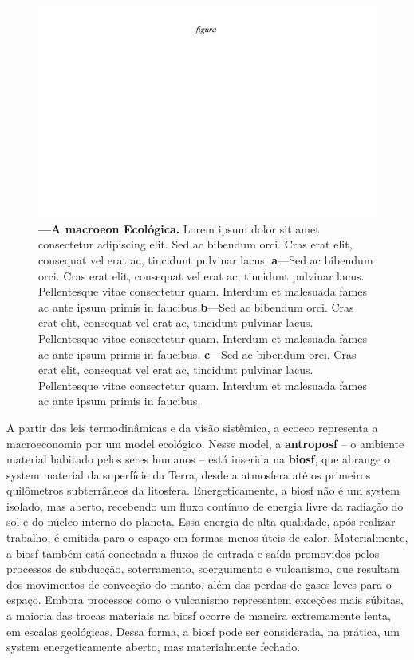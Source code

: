 \documentclass[./main.tex]{subfiles}
\begin{document}
\begin{figure}[t!] 
\centering				
\includegraphics[width=0.98\linewidth]{figs/fig_m.jpg}		
\caption[A \gls{macroeon} Ecológica]
{\textbf{---\;A \gls{macroeon} Ecológica.}
    Lorem ipsum dolor sit amet consectetur adipiscing elit. Sed ac bibendum orci. Cras erat elit, consequat vel erat ac, tincidunt pulvinar lacus. \;\textbf{a}\;---\;Sed ac bibendum orci. Cras erat elit, consequat vel erat ac, tincidunt pulvinar lacus. Pellentesque vitae consectetur quam. Interdum et malesuada fames ac ante ipsum primis in faucibus.\;\textbf{b}\;---\;Sed ac bibendum orci. Cras erat elit, consequat vel erat ac, tincidunt pulvinar lacus. Pellentesque vitae consectetur quam. Interdum et malesuada fames ac ante ipsum primis in faucibus. \;\textbf{c}\;---\;Sed ac bibendum orci. Cras erat elit, consequat vel erat ac, tincidunt pulvinar lacus. Pellentesque vitae consectetur quam. Interdum et malesuada fames ac ante ipsum primis in faucibus.
}
\label{fig:eco:ecomodel} 		
\end{figure}

\par A partir das leis termodinâmicas e da visão sistêmica, a \gls{ecoeco} representa a macroeconomia por um \gls{model} ecológico. Nesse \gls{model}, a \textbf{\gls{antroposf}} – o ambiente material habitado pelos seres humanos – está inserida na \textbf{\gls{biosf}}, que abrange o \gls{system} material da superfície da Terra, desde a atmosfera até os primeiros quilômetros subterrâneos da litosfera. Energeticamente, a \gls{biosf} não é um \gls{system} isolado, mas aberto, recebendo um fluxo contínuo de energia livre da radiação do sol e do núcleo interno do planeta. Essa energia de alta qualidade, após realizar trabalho, é emitida para o espaço em formas menos úteis de calor. Materialmente, a \gls{biosf} também está conectada a fluxos de entrada e saída promovidos pelos processos de subducção, soterramento, soerguimento e vulcanismo, que resultam dos movimentos de convecção do manto, além das perdas de gases leves para o espaço. Embora processos como o vulcanismo representem exceções mais súbitas, a maioria das trocas materiais na \gls{biosf} ocorre de maneira extremamente lenta, em escalas geológicas. Dessa forma, a \gls{biosf} pode ser considerada, na prática, um \gls{system} energeticamente aberto, mas materialmente fechado.
\end{document}
